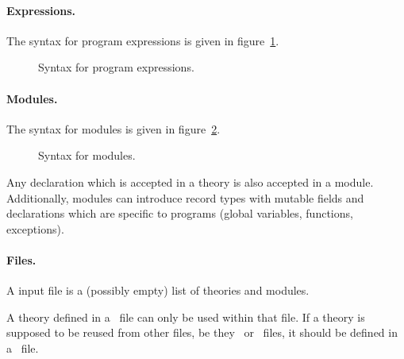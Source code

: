 \paragraph{Expressions.}
The syntax for program expressions is given in figure~\ref{fig:bnf:expr}.
\begin{figure}
  \begin{center}\framebox{}\end{center}
  \caption{Syntax for program expressions.}
\label{fig:bnf:expr}
\end{figure}

\paragraph{Modules.}
The syntax for modules is given in figure~\ref{fig:bnf:module}.
\begin{figure}
  \begin{center}\framebox{}\end{center}
  \caption{Syntax for modules.}
\label{fig:bnf:module}
\end{figure}
Any declaration which is accepted in a theory is also accepted in a
module. Additionally, modules can introduce record types with mutable
fields and declarations which are specific to programs (global
variables, functions, exceptions).

\paragraph{Files.}
A \whyml input file is a (possibly empty) list of theories and modules.
\begin{center}\framebox{}\end{center}
A theory defined in a \whyml\ file can only be used within that
file. If a theory is supposed to be reused from other files, be they
\why\ or \whyml\ files, it should be defined in a \why\ file.

